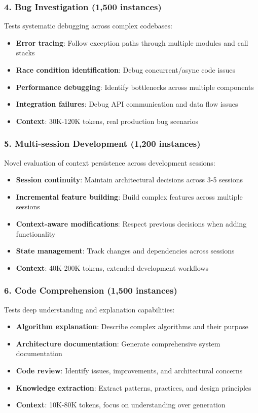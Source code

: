 \documentclass{article}
\begin{document}
\subsubsection{4. Bug Investigation (1,500 instances)}
Tests systematic debugging across complex codebases:
\begin{itemize}
    \item \textbf{Error tracing}: Follow exception paths through multiple modules and call stacks
    \item \textbf{Race condition identification}: Debug concurrent/async code issues
    \item \textbf{Performance debugging}: Identify bottlenecks across multiple components
    \item \textbf{Integration failures}: Debug API communication and data flow issues
    \item \textbf{Context}: 30K-120K tokens, real production bug scenarios
\end{itemize}

\subsubsection{5. Multi-session Development (1,200 instances)}
Novel evaluation of context persistence across development sessions:
\begin{itemize}
    \item \textbf{Session continuity}: Maintain architectural decisions across 3-5 sessions
    \item \textbf{Incremental feature building}: Build complex features across multiple sessions
    \item \textbf{Context-aware modifications}: Respect previous decisions when adding functionality
    \item \textbf{State management}: Track changes and dependencies across sessions
    \item \textbf{Context}: 40K-200K tokens, extended development workflows
\end{itemize}

\subsubsection{6. Code Comprehension (1,500 instances)}
Tests deep understanding and explanation capabilities:
\begin{itemize}
    \item \textbf{Algorithm explanation}: Describe complex algorithms and their purpose
    \item \textbf{Architecture documentation}: Generate comprehensive system documentation
    \item \textbf{Code review}: Identify issues, improvements, and architectural concerns
    \item \textbf{Knowledge extraction}: Extract patterns, practices, and design principles
    \item \textbf{Context}: 10K-80K tokens, focus on understanding over generation
\end{itemize}
\end{document}
